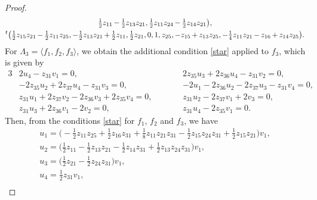 \documentclass[11pt]{article}
\numberwithin{equation}{section}
\numberwithin{equation}{section}
\theoremstyle{definition}
\newcommand{\0}{\boldsymbol{0}}
\begin{document}
\begin{proof}
\begin{gather*}
\tfrac{1}{2}z_{11}\hspace{-0.6pt}-\hspace{-0.6pt} \tfrac{1}{2}z_{13}z_{21}, \tfrac{1}{2}z_{11}z_{24} \hspace{-0.6pt}-\hspace{-0.6pt} \tfrac{1}{2}z_{14}z_{21}\bigr),
\\
{}^t\bigl(\tfrac{1}{2}z_{15}z_{21} \hspace{-0.6pt}-\hspace{-0.6pt} \tfrac{1}{2}z_{11}z_{25}, - \tfrac{1}{2}z_{13}z_{21} \hspace{-0.6pt}+\hspace{-0.6pt} \tfrac{1}{2}z_{11},
\tfrac{1}{2}z_{21}, 0, 1, z_{25}, - z_{15} \hspace{-0.6pt}+\hspace{-0.6pt} z_{13}z_{25}, -\tfrac{1}{4}z_{11}z_{21} \hspace{-0.6pt}-\hspace{-0.6pt} z_{16} \hspace{-0.6pt}+\hspace{-0.6pt} z_{14}z_{25}\bigr).
\end{gather*}
For $\Lambda_3 = \langle f_1, f_2, f_3\rangle$, we obtain the additional condition \eqref{star} applied to $f_3$,
which is given by
\begin{alignat*}{3}
&2u_4 - z_{31}v_1 = 0,
\qquad&&
2z_{35}u_3 + 2z_{36}u_4 - z_{31}v_2 = 0,&
\\
&-2 z_{35}u_2 + 2z_{37}u_4 - z_{31}v_3 = 0,
\qquad&&
-2u_1 - 2z_{36}u_2 - 2z_{37}u_3 - z_{31}v_4 = 0,&
\\
&z_{31}u_1 + 2z_{37}v_2 - 2z_{36}v_3 + 2z_{35}v_4 = 0,
\qquad&&
z_{31}u_2 - 2z_{37}v_1 + 2v_3 = 0,&
\\
&z_{31}u_3 + 2z_{36}v_1 - 2v_2 = 0,
\qquad&&
z_{31}u_4 - 2z_{35}v_1 = 0.&
\end{alignat*}
Then, from the conditions \eqref{star} for $f_1$, $f_2$ and $f_3$, we have
\begin{gather*}
u_1 = \biggl(- \frac{1}{2}z_{11}z_{25} + \frac{1}{2}z_{16}z_{31} + \frac{1}{8}z_{11}z_{21}z_{31}
- \frac{1}{2}z_{15}z_{24}z_{31} + \frac{1}{2}z_{15}z_{21}\biggr)v_1,
\\
u_2 = \biggl(\frac{1}{2}z_{11} - \frac{1}{2}z_{13}z_{21} - \frac{1}{2}z_{14}z_{31} + \frac{1}{2}z_{13}z_{24}z_{31}\biggr)v_1,
\\
u_3 = \biggl(\frac{1}{2}z_{21} - \frac{1}{2}z_{24}z_{31}\biggr)v_1,
\\
u_4 = \frac{1}{2}z_{31}v_1,
\\

\end{gather*}
\end{proof}
\end{document}
